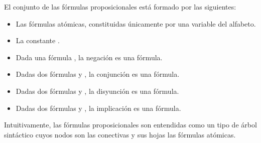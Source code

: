 \begin{isabellebody}
\begin{isamarkuptext}
  \begin{definicion}
    El conjunto de las fórmulas proposicionales está formado por las 
    siguientes:
    \begin{itemize}
      \item Las fórmulas atómicas, constituidas únicamente por una 
        variable del alfabeto. 
      \item La constante \isa{{\isasymbottom}}.
      \item Dada una fórmula , la negación  es una fórmula.
      \item Dadas dos fórmulas  y , la conjunción  es una
        fórmula.
      \item Dadas dos fórmulas  y , la disyunción  es una
        fórmula.
      \item Dadas dos fórmulas  y , la implicación  es 
        una fórmula.
    \end{itemize}
  \end{definicion}

 Intuitivamente, las fórmulas proposicionales son entendidas como un 
 tipo de árbol sintáctico cuyos nodos son las conectivas y sus hojas las 
  fórmulas atómicas.



\end{isamarkuptext}
\end{isabellebody}
